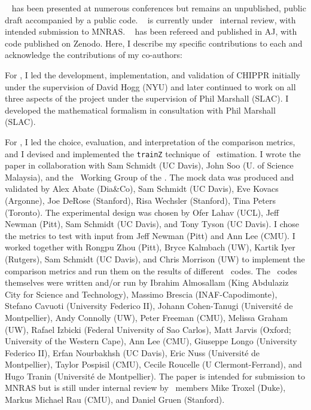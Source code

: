 \chapname~ has been presented at numerous conferences but remains an unpublished, public draft accompanied by a public code.
\chapname~ is currently under \desc\ internal review, with intended submission to MNRAS.
\chapname~ has been refereed and published in AJ, with code published on Zenodo.
Here, I describe my specific contributions to each \chapname and acknowledge the contributions of my co-authors:
\begin{enumerate}

{\item For , I led the development, implementation, and validation of CHIPPR initially under the supervision of David Hogg (NYU) and later continued to work on all three aspects of the project under the supervision of Phil Marshall (SLAC).
	I developed the mathematical formalism in consultation with Phil Marshall (SLAC).}

{\item For , I led the choice, evaluation, and interpretation of the comparison metrics, and I devised and implemented the \texttt{trainZ} technique of \pzpdf\ estimation.
	I wrote the paper in collaboration with Sam Schmidt (UC Davis), John Soo (U. of Science Malaysia), and the \Pz\ Working Group of the \desc.  
	The mock data was produced and validated by Alex Abate (Dia\&Co), Sam Schmidt (UC Davis), Eve Kovacs (Argonne), Joe DeRose (Stanford), Risa Wechsler (Stanford), Tina Peters (Toronto).
	The experimental design was chosen by Ofer Lahav (UCL), Jeff Newman (Pitt), Sam Schmidt (UC Davis), and Tony Tyson (UC Davis).
	I chose the metrics to test with input from Jeff Newman (Pitt) and Ann Lee (CMU).
	I worked together with Rongpu Zhou (Pitt), Bryce Kalmbach (UW), Kartik Iyer (Rutgers), Sam Schmidt (UC Davis), and Chris Morrison (UW) to implement the comparison metrics and run them on the results of different \pzpdf\ codes.
	The \pzpdf\ codes themselves were written and/or run by Ibrahim Almosallam (King Abdulaziz City for Science and Technology), Massimo Brescia (INAF-Capodimonte), Stefano Cavuoti (University Federico II), Johann Cohen-Tanugi (Universit\'e de Montpellier),  Andy Connolly (UW), Peter Freeman (CMU), Melissa Graham (UW), Rafael Izbicki (Federal University of Sao Carlos), Matt Jarvis (Oxford; University of the Western Cape), Ann Lee (CMU), Giuseppe Longo (University Federico II), Erfan Nourbakhsh (UC Davis), Eric Nuss (Universit\'e de Montpellier), Taylor Pospisil (CMU), Cecile Roucelle (U Clermont-Ferrand), and Hugo Tranin (Universit\'e de Montpellier).
	The paper is intended for submission to MNRAS but is still under internal review by \desc\ members Mike Troxel (Duke), Markus Michael Rau (CMU), and Daniel Gruen (Stanford).}


\end{enumerate}
